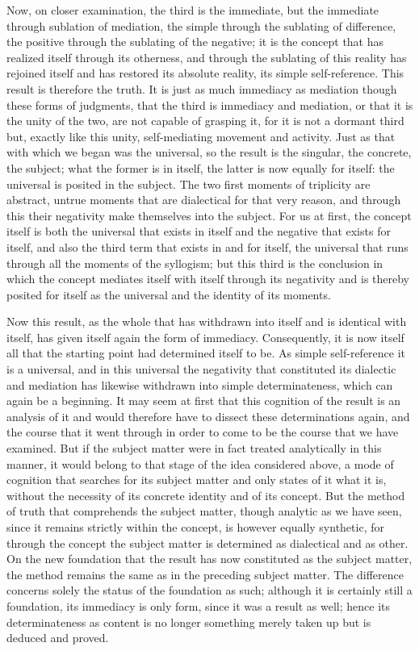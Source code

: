 Now, on closer examination, the third is the immediate,
but the immediate through sublation of mediation,
the simple through the sublating of difference,
the positive through the sublating of the negative;
it is the concept that has realized itself through its otherness,
and through the sublating of this reality has rejoined itself
and has restored its absolute reality,
its simple self-reference.
This result is therefore the truth.
It is just as much immediacy as mediation
though these forms of judgments,
that the third is immediacy and mediation,
or that it is the unity of the two,
are not capable of grasping it,
for it is not a dormant third
but, exactly like this unity,
self-mediating movement and activity.
Just as that with which we began was the universal,
so the result is the singular, the concrete, the subject;
what the former is in itself, the latter is now equally for itself:
the universal is posited in the subject.
The two first moments of triplicity are abstract,
untrue moments that are dialectical for that very reason,
and through this their negativity make themselves into the subject.
For us at first, the concept itself is
both the universal that exists in itself
and the negative that exists for itself,
and also the third term that exists in and for itself,
the universal that runs through all the moments of the syllogism;
but this third is the conclusion in which
the concept mediates itself with itself through its negativity
and is thereby posited for itself as the universal
and the identity of its moments.

Now this result, as the whole that has withdrawn into itself
and is identical with itself, has given itself again
the form of immediacy.
Consequently, it is now itself all that
the starting point had determined itself to be.
As simple self-reference it is a universal,
and in this universal the negativity that
constituted its dialectic and mediation has
likewise withdrawn into simple determinateness,
which can again be a beginning.
It may seem at first that this cognition of the result
is an analysis of it
and would therefore have to dissect these determinations again,
and the course that it went through in order to come to be
the course that we have examined.
But if the subject matter were in fact treated analytically in this manner,
it would belong to that stage of the idea considered above,
a mode of cognition that searches for its subject matter
and only states of it what it is,
without the necessity of its concrete identity and of its concept.
But the method of truth that comprehends the subject matter,
though analytic as we have seen,
since it remains strictly within the concept,
is however equally synthetic,
for through the concept the subject matter is
determined as dialectical and as other.
On the new foundation that the result
has now constituted as the subject matter,
the method remains the same as in the preceding subject matter.
The difference concerns solely the
status of the foundation as such;
although it is certainly still a foundation,
its immediacy is only form,
since it was a result as well;
hence its determinateness as content is
no longer something merely taken up
but is deduced and proved.

